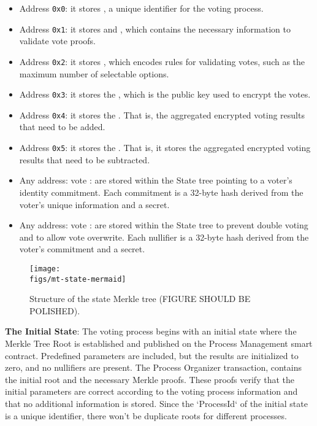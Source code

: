 \begin{itemize}
	\item Address \texttt{0x0}: it stores \processid, a unique identifier for the voting process.
	\item Address \texttt{0x1}: it stores \censusroot and \type, which contains the necessary information to validate vote proofs.
	\item Address \texttt{0x2}: it stores \ballotmode, which encodes rules for validating votes, such as the maximum number of selectable options.
	\item Address \texttt{0x3}: it stores the \epk, which is the public key used to encrypt the votes.
	\item Address \texttt{0x4}: it stores the \addaccumulator. That is, the aggregated encrypted voting results that need to be added.
	\item Address \texttt{0x5}: it stores the \substractaccumulator. That is, it stores the aggregated encrypted voting results that need to be subtracted.
	\item Any address: vote \addresses: are stored within the State tree pointing to a voter's identity commitment. Each commitment is a 32-byte hash derived from the voter's unique information and a secret.
	\item Any address: vote \nullifiers: are stored within the State tree to prevent double voting and to allow vote overwrite. Each nullifier is a 32-byte hash derived from the voter's commitment and a secret.
\end{itemize}


\begin{figure}[h]
	\centerline{\texttt{[image: \\figs/mt-state-mermaid]}}
	\caption{Structure of the state Merkle tree (FIGURE SHOULD BE POLISHED).}
	\label{fig:mt-state}
\end{figure}

\textbf{The Initial State}: The voting process begins with an initial state where the Merkle Tree Root is established and published on the Process Management smart contract. Predefined parameters are included, but the results are initialized to zero, and no nullifiers are present. The Process Organizer transaction, contains the initial root and the necessary Merkle proofs. These proofs verify that the initial parameters are correct according to the voting process information and that no additional information is stored. Since the `ProcessId` of the initial state is a unique identifier, there won't be duplicate roots for different processes.


